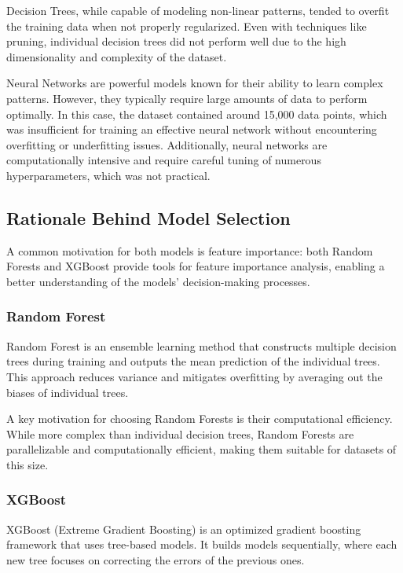 \documentclass[12pt]{article}
\begin{document}
Decision Trees, while capable of modeling non-linear patterns, tended to overfit the training data when not properly regularized. Even with techniques like pruning, individual decision trees did not perform well due to the high dimensionality and complexity of the dataset.

Neural Networks are powerful models known for their ability to learn complex patterns. However, they typically require large amounts of data to perform optimally. In this case, the dataset contained around 15,000 data points, which was insufficient for training an effective neural network without encountering overfitting or underfitting issues. Additionally, neural networks are computationally intensive and require careful tuning of numerous hyperparameters, which was not practical.

\subsection{Rationale Behind Model Selection}

A common motivation for both models is feature importance: both Random Forests and XGBoost provide tools for feature importance analysis, enabling a better understanding of the models' decision-making processes.

\subsubsection{Random Forest}

Random Forest is an ensemble learning method that constructs multiple decision trees during training and outputs the mean prediction of the individual trees. This approach reduces variance and mitigates overfitting by averaging out the biases of individual trees.

A key motivation for choosing Random Forests is their computational efficiency. While more complex than individual decision trees, Random Forests are parallelizable and computationally efficient, making them suitable for datasets of this size.

\subsubsection{XGBoost}

XGBoost (Extreme Gradient Boosting) is an optimized gradient boosting framework that uses tree-based models. It builds models sequentially, where each new tree focuses on correcting the errors of the previous ones.
\end{document}
